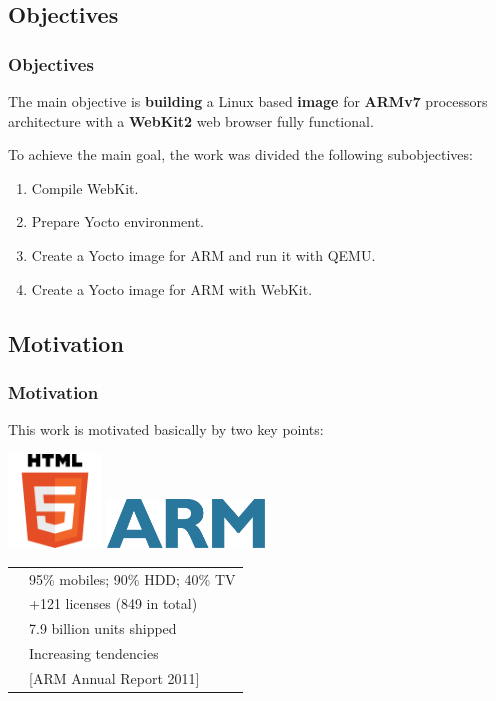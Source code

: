 \documentclass[slidestop,compress,mathserif]{beamer}
\begin{document}
\subsection{Objectives}
\begin{frame}
  \frametitle{Objectives}

  The main objective is \textbf{building} a Linux based \textbf{image} for \textbf{ARMv7} processors architecture with a \textbf{WebKit2} web browser fully functional.
  
  To achieve the main goal, the work was divided the following subobjectives:

  \vspace{5mm}

  \begin{enumerate}
    \item<2-> Compile WebKit.
    \item<3-> Prepare Yocto environment.
    \item<4-> Create a Yocto image for ARM and run it with QEMU.
    \item<5-> Create a Yocto image for ARM with WebKit.
  \end{enumerate}

\end{frame}

\subsection{Motivation}
\begin{frame}
  \frametitle{Motivation}

  This work is motivated basically by two key points:
  \pause

  \vspace{10mm}
  \begin{center}
    \includegraphics[height=2.5cm]{images/HTML5-logo.png}
    \hspace{10mm}
    \pause
    \href{http://financialreports.arm.com/downloads/pdfs/ARM_AR11_Our_Story_v1.pdf}{\includegraphics[height=1.3cm]{images/ARM-logo.png}}
    
    \pause
    \begin{tabularx}{\textwidth}{Xl}
       & 95\% mobiles; 90\% HDD; 40\% TV \\
       & +121 licenses (849 in total) \\
       & 7.9 billion units shipped \\
       & Increasing tendencies \\
       & [ARM Annual Report 2011]
    \end{tabularx}
  \end{center}

\end{frame}
\end{document}
